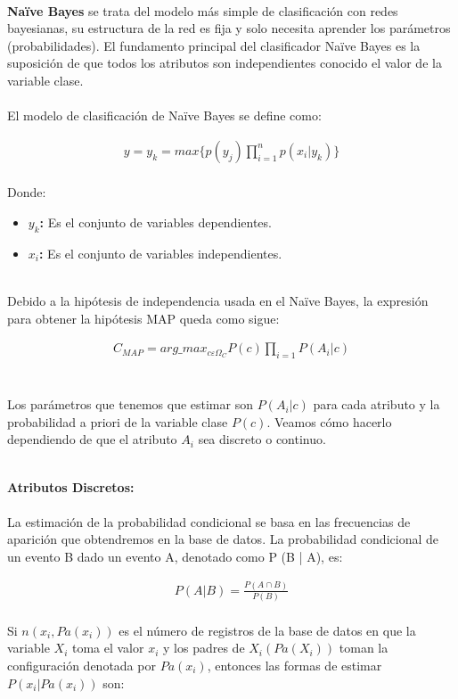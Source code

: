 \documentclass[letterpaper, 10 pt, conference]{ieeeconf}
\begin{document}
\textbf{\\Naïve Bayes} se trata del modelo más simple de clasificación con redes bayesianas, su estructura de la red es fija y solo necesita aprender los parámetros (probabilidades). El fundamento principal del clasificador Naïve Bayes es la suposición de que todos los atributos son independientes conocido el valor de la variable clase.\\\\ El modelo de clasificación de Naïve Bayes se define como:

\begin{equation}\label{eq1}
    \begin{split}
    y = y_k = max\{ p(y_j) \prod_{i=1}^{n}p(x_i|y_k)\}
    \end{split}
\end{equation}\\ Donde:
\begin{itemize}
    \item[] \textbf{$y_k$:} Es el conjunto de variables dependientes.
    \item[] \textbf{$x_i$:} Es el conjunto de variables independientes.\\
\end{itemize}\\ Debido a la hipótesis de independencia usada en el Naïve Bayes, la expresión para obtener la hipótesis MAP queda como sigue:

\begin{equation} \label{eq2}
\begin{split}
C_{MAP} = arg\_max_{c \varepsilon \Omega_C} P(c) \prod_{i=1}{P(A_i|c)}
\end{split}
\end{equation}\\\\ Los parámetros que tenemos que estimar son $P(A_i|c)$ para cada atributo y la probabilidad a priori de la variable clase $P(c)$. Veamos cómo hacerlo dependiendo de que el atributo $A_i$ sea discreto o continuo.

\textbf{\\Atributos Discretos:\\\\} La estimación de la probabilidad condicional se basa en las frecuencias de aparición que obtendremos en la base de datos. La probabilidad condicional de un evento B dado un evento A, denotado como P (B | A), es:

\begin{equation} \label{eq3}
\begin{split}
P(A|B) = \frac{P(A \cap B)}{P(B)}
\end{split}
\end{equation}\\ Si $n(x_i,Pa(x_i))$ es el número de registros de la base de datos en que la variable $X_i$ toma el valor $x_i$ y los padres de $X_i (Pa(X_i))$ toman la configuración denotada por $Pa(x_i)$, entonces las formas de estimar $P(x_i|Pa(x_i))$ son:\\
\end{document}
